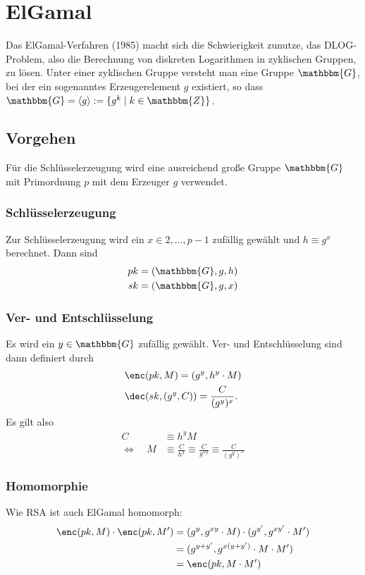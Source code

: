 \section{ElGamal}
\label{ch:asymenc:elgamal} Das ElGamal-Verfahren (1985) macht sich die
Schwierigkeit zunutze, das DLOG-Problem, also die Berechnung von
diskreten Logarithmen in zyklischen Gruppen, zu lösen. Unter einer
zyklischen Gruppe versteht man eine Gruppe $\mathbbm{G}$, bei der ein
sogenanntes Erzeugerelement $g$ existiert, so dass $\mathbbm{G} =
\langle g \rangle := \{g^k \mid k \in \mathbbm{Z}\}$.

\subsection{Vorgehen} 
Für die Schlüsselerzeugung wird eine ausreichend große Gruppe
$\mathbbm{G}$ mit Primordnung $p$ mit dem Erzeuger $g$ verwendet. 
\subsubsection{Schlüsselerzeugung}
Zur Schlüsselerzeugung wird ein $x \in {2,\dots, p-1}$ zufällig gewählt
und $h \equiv g^x$ berechnet. Dann sind
\begin{align*}
pk &= (\mathbbm{G}, g, h)\\ 
sk &= (\mathbbm{G}, g, x)
\end{align*}

\subsubsection{Ver- und Entschlüsselung}
Es wird ein $y \in \mathbbm{G}$ zufällig gewählt. Ver- und Entschlüsselung sind dann definiert durch
\begin{align*} 
&\enc(pk, M) = (g^y, h^y \cdot M) \\ 
&\dec(sk, (g^y, C))
= \frac{C}{(g^y)^x}.
\end{align*}
Es gilt also 
\begin{align*}
  C &\equiv h^y M \\
 \Leftrightarrow \quad M& \equiv \frac{C}{h^y} \equiv \frac{C}{g^{xy}} \equiv \frac{C}{(g^y)^x}
\end{align*}

\subsubsection{Homomorphie}
Wie RSA ist auch ElGamal homomorph:
\begin{align*} 
\enc({pk,M}) \cdot \enc({pk,M'}) &= (g^y, g^{xy} \cdot M) \cdot (g^{y'},
                                   g^{xy'} \cdot M')\\ 
                                 &= (g^{y+y'}, g^{x(y + y')} \cdot M
                                   \cdot M')\\ 
                                 &= \enc({pk, M \cdot M'})
\end{align*}

